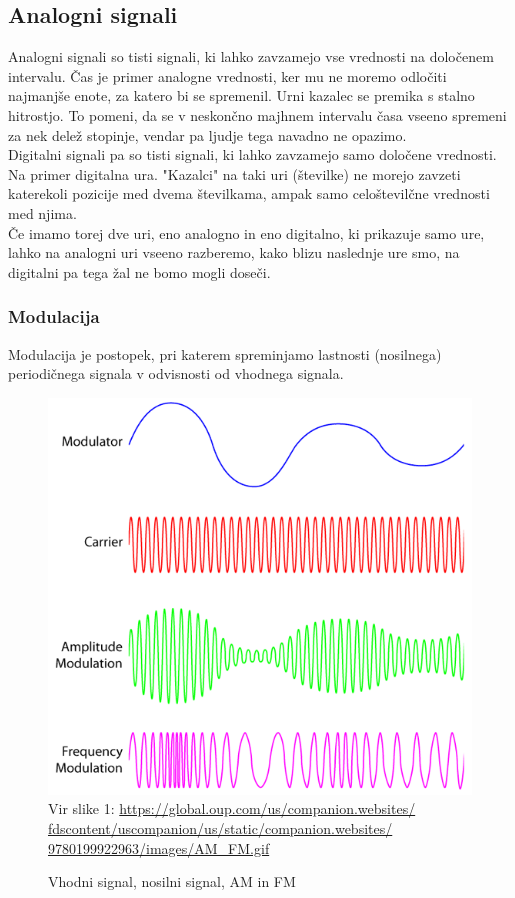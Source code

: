 \documentclass[12pt]{article}
\begin{document}
    \subsection{Analogni signali}
            Analogni signali so tisti signali, ki lahko zavzamejo vse vrednosti
            na določenem intervalu. Čas je primer analogne vrednosti, ker mu ne
            moremo odločiti najmanjše enote, za katero bi se spremenil. Urni
            kazalec se premika s stalno hitrostjo. To pomeni, da se v neskončno
            majhnem intervalu časa vseeno spremeni za nek delež stopinje, vendar
            pa ljudje tega navadno ne opazimo.\\
            Digitalni signali pa so tisti signali, ki lahko zavzamejo samo 
            določene vrednosti. Na primer digitalna ura. "Kazalci" na taki uri 
            (številke) ne morejo zavzeti katerekoli pozicije med dvema 
            številkama, ampak samo celoštevilčne vrednosti med njima.\\
            Če imamo torej dve uri, eno analogno in eno digitalno, ki prikazuje
            samo ure, lahko na analogni uri vseeno razberemo, kako blizu 
            naslednje ure smo, na digitalni pa tega žal ne bomo mogli doseči.
        \subsubsection{Modulacija}
            Modulacija je postopek, pri katerem spreminjamo lastnosti 
            (nosilnega) periodičnega signala v odvisnosti od vhodnega signala.
            
            \begin{figure}
                \centering
                \caption{Vhodni signal, nosilni signal, AM in FM}
                \includegraphics[width=0.3\linewidth]{slike/anfm.png}
                \label{fig:Vhodni signal, nosilni signal, AM in FM}
                \\
                Vir slike 1: \url{https://global.oup.com/us/companion.websites/
                fdscontent/uscompanion/us/static/companion.websites/
                9780199922963/images/AM_FM.gif}
            \end{figure}
\end{document}
